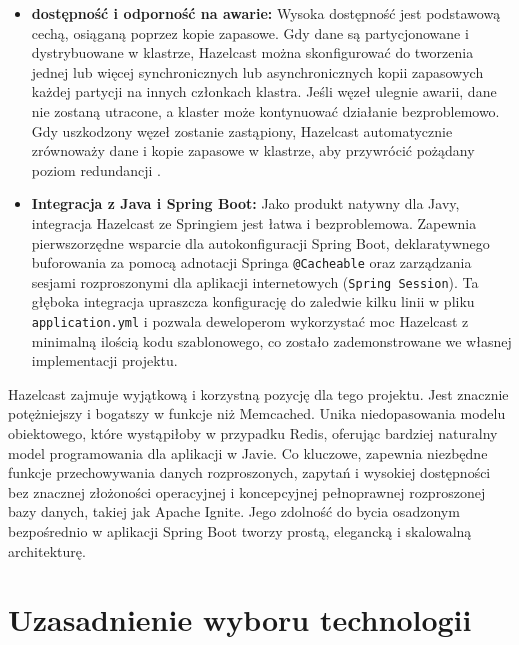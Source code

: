 \begin{itemize}
    \item \textbf{dostępność i odporność na awarie:} Wysoka dostępność jest podstawową cechą, osiąganą poprzez kopie zapasowe. Gdy dane są partycjonowane i dystrybuowane w klastrze, Hazelcast można skonfigurować do tworzenia jednej lub więcej synchronicznych lub asynchronicznych kopii zapasowych każdej partycji na innych członkach klastra. Jeśli węzeł ulegnie awarii, dane nie zostaną utracone, a klaster może kontynuować działanie bezproblemowo. Gdy uszkodzony węzeł zostanie zastąpiony, Hazelcast automatycznie zrównoważy dane i kopie zapasowe w klastrze, aby przywrócić pożądany poziom redundancji \cite{hazelcast-docs}.
    \item \textbf{Integracja z Java i Spring Boot:} Jako produkt natywny dla Javy, integracja Hazelcast ze Springiem jest łatwa i bezproblemowa. Zapewnia pierwszorzędne wsparcie dla autokonfiguracji Spring Boot, deklaratywnego buforowania za pomocą adnotacji Springa \texttt{@Cacheable} oraz zarządzania sesjami rozproszonymi dla aplikacji internetowych (\texttt{Spring Session}). Ta głęboka integracja upraszcza konfigurację do zaledwie kilku linii w pliku \texttt{application.yml} i pozwala deweloperom wykorzystać moc Hazelcast z minimalną ilością kodu szablonowego, co zostało zademonstrowane we własnej implementacji projektu.
\end{itemize}

Hazelcast zajmuje wyjątkową i korzystną pozycję dla tego projektu. Jest znacznie potężniejszy i bogatszy w funkcje niż Memcached. Unika niedopasowania modelu obiektowego, które wystąpiłoby w przypadku Redis, oferując bardziej naturalny model programowania dla aplikacji w Javie. Co kluczowe, zapewnia niezbędne funkcje przechowywania danych rozproszonych, zapytań i wysokiej dostępności bez znacznej złożoności operacyjnej i koncepcyjnej pełnoprawnej rozproszonej bazy danych, takiej jak Apache Ignite. Jego zdolność do bycia osadzonym bezpośrednio w aplikacji Spring Boot tworzy prostą, elegancką i skalowalną architekturę.

\section{Uzasadnienie wyboru technologii}

